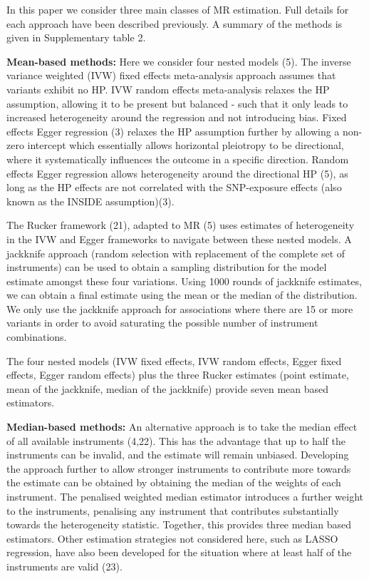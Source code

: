 \documentclass[]{article}
\begin{document}
In this paper we consider three main classes of MR estimation. Full
details for each approach have been described previously. A summary of
the methods is given in Supplementary table 2.

\textbf{Mean-based methods:} Here we consider four nested models (5).
The inverse variance weighted (IVW) fixed effects meta-analysis approach
assumes that variants exhibit no HP. IVW random effects meta-analysis
relaxes the HP assumption, allowing it to be present but balanced - such
that it only leads to increased heterogeneity around the regression and
not introducing bias. Fixed effects Egger regression (3) relaxes the HP
assumption further by allowing a non-zero intercept which essentially
allows horizontal pleiotropy to be directional, where it systematically
influences the outcome in a specific direction. Random effects Egger
regression allows heterogeneity around the directional HP (5), as long
as the HP effects are not correlated with the SNP-exposure effects (also
known as the INSIDE assumption)(3).

The Rucker framework (21), adapted to MR (5) uses estimates of
heterogeneity in the IVW and Egger frameworks to navigate between these
nested models. A jackknife approach (random selection with replacement
of the complete set of instruments) can be used to obtain a sampling
distribution for the model estimate amongst these four variations. Using
1000 rounds of jackknife estimates, we can obtain a final estimate using
the mean or the median of the distribution. We only use the jackknife
approach for associations where there are 15 or more variants in order
to avoid saturating the possible number of instrument combinations.

The four nested models (IVW fixed effects, IVW random effects, Egger
fixed effects, Egger random effects) plus the three Rucker estimates
(point estimate, mean of the jackknife, median of the jackknife) provide
seven mean based estimators.

\textbf{Median-based methods:} An alternative approach is to take the
median effect of all available instruments (4,22). This has the
advantage that up to half the instruments can be invalid, and the
estimate will remain unbiased. Developing the approach further to allow
stronger instruments to contribute more towards the estimate can be
obtained by obtaining the median of the weights of each instrument. The
penalised weighted median estimator introduces a further weight to the
instruments, penalising any instrument that contributes substantially
towards the heterogeneity statistic. Together, this provides three
median based estimators. Other estimation strategies not considered
here, such as LASSO regression, have also been developed for the
situation where at least half of the instruments are valid (23).
\end{document}
